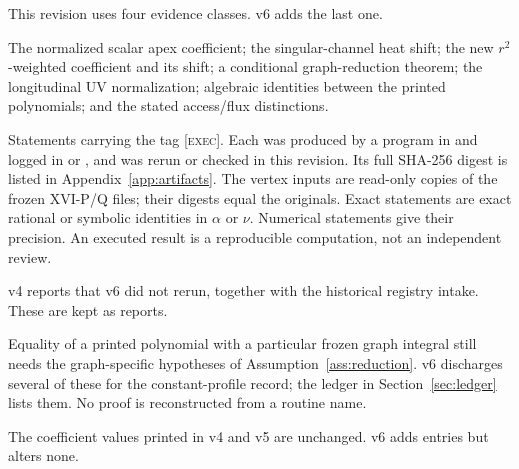 This revision uses four evidence classes.
v6 adds the last one.
\begin{description}[style=nextline,leftmargin=0pt]
\item[Locally proved.]
The normalized scalar apex coefficient; the singular-channel heat
shift; the new \(r^2\)-weighted coefficient and its shift; a
conditional graph-reduction theorem; the longitudinal UV
normalization; algebraic identities between the printed polynomials;
and the stated access/flux distinctions.

\item[Executed and artifact-verified in v6.]
Statements carrying the tag \textsc{[exec]}.
Each was produced by a program in  and logged in
 or , and was rerun or checked in this
revision.
Its full SHA-256 digest is listed in Appendix~\ref{app:artifacts}.
The vertex inputs are read-only copies of the frozen XVI-P/Q
files; their digests equal the originals.
Exact statements are exact rational or symbolic identities in
\(\alpha\) or \(\nu\).
Numerical statements give their precision.
An executed result is a reproducible computation, not an
independent review.

\item[Supplied computational record.]
v4 reports that v6 did not rerun, together with the historical
registry intake.
These are kept as reports.

\item[Conditional graph identification.]
Equality of a printed polynomial with a particular frozen graph
integral still needs the graph-specific hypotheses of
Assumption~\ref{ass:reduction}.
v6 discharges several of these for the constant-profile record;
the ledger in Section~\ref{sec:ledger} lists them.
No proof is reconstructed from a routine name.
\end{description}


The coefficient values printed in v4 and v5 are unchanged.
v6 adds entries but alters none.

